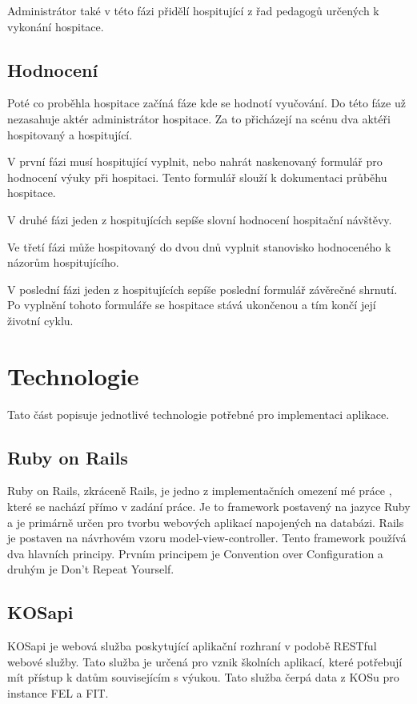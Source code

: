 Administrátor také v této fázi přidělí hospitující z řad pedagogů určených k vykonání hospitace.  
 
\subsection{Hodnocení}
Poté co proběhla hospitace začíná fáze kde se hodnotí vyučování. Do této fáze už nezasahuje aktér administrátor hospitace. Za to přicházejí na scénu dva aktéři hospitovaný a hospitující.

V první fázi musí hospitující vyplnit, nebo nahrát naskenovaný formulář pro hodnocení výuky při hospitaci. Tento formulář slouží k dokumentaci průběhu hospitace.

V druhé fázi jeden z hospitujících sepíše slovní hodnocení hospitační návštěvy.

Ve třetí fázi může hospitovaný do dvou dnů vyplnit stanovisko hodnoceného k názorům hospitujícího.  

V poslední fázi jeden z hospitujících sepíše poslední formulář závěrečné shrnutí. Po vyplnění tohoto formuláře se hospitace stává ukončenou a tím končí její životní cyklu.
 
\section{Technologie}
Tato část popisuje jednotlivé technologie potřebné pro implementaci aplikace.

\subsection{Ruby on Rails}
Ruby on Rails, zkráceně Rails, je jedno z implementačních omezení mé práce , které se nachází přímo v zadání práce. Je to framework postavený na jazyce Ruby a je primárně určen pro tvorbu webových aplikací napojených na databázi. Rails je postaven na návrhovém vzoru model-view-controller. Tento framework používá dva hlavních principy. Prvním principem je Convention over Configuration a druhým je Don’t Repeat Yourself.

\subsection{KOSapi}
KOSapi je webová služba poskytující aplikační rozhraní v podobě RESTful webové služby. Tato služba je určená pro vznik školních aplikací, které potřebují mít přístup k datům souvisejícím s výukou. Tato služba čerpá data z KOSu pro instance FEL a FIT.


